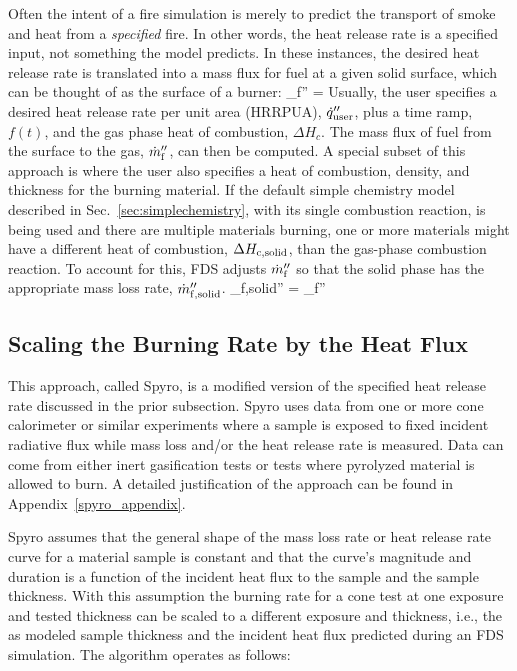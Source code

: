 Often the intent of a fire simulation is merely to predict the transport of smoke and heat from a {\em specified} fire. In other words, the heat release rate is a specified input, not something the model predicts. In these instances, the desired heat release rate is translated into a mass flux for fuel at a given solid surface, which can be thought of as the surface of a burner:
\be
   \dm_{\rm f}'' = 
\ee
Usually, the user specifies a desired heat release rate per unit area (HRRPUA), $\dot{q}_{\rm user}''$, plus a time ramp, $f(t)$, and the gas phase heat of combustion, $\Delta H_{\si{c}}$. The mass flux of fuel from the surface to the gas, $\dot{m}_{\rm f}''$, can then be computed. A special subset of this approach is where the user also specifies a heat of combustion, density, and thickness for the burning material. If the default simple chemistry model described in Sec.~\ref{sec:simplechemistry}, with its single combustion reaction, is being used and there are multiple materials burning, one or more materials might have a different heat of combustion, $\Delta H_{\si{c}{\rm ,solid}}$, than the gas-phase combustion reaction. To account for this, FDS adjusts $\dot{m}_{\rm f}''$ so that the solid phase has the appropriate mass loss rate, $\dot{m}_{\rm f,solid}''$.
\be
\dm_{\rm f,solid}'' = \dm_{\rm f}'' 
\ee

\subsection{Scaling the Burning Rate by the Heat Flux}
\label{spyro_algorithm}

This approach, called Spyro, is a modified version of the specified heat release rate discussed in the prior subsection. Spyro uses data from one or more cone calorimeter or similar experiments where a sample is exposed to fixed incident radiative flux while mass loss and/or the heat release rate is measured. Data can come from either inert gasification tests or tests where pyrolyzed material is allowed to burn. A detailed justification of the approach can be found in Appendix~\ref{spyro_appendix}.


Spyro assumes that the general shape of the mass loss rate or heat release rate curve for a material sample is constant and that the curve's magnitude and duration is a function of the incident heat flux to the sample and the sample thickness. With this assumption the burning rate for a cone test at one exposure and tested thickness can be scaled to a different exposure and thickness, i.e., the as modeled sample thickness and the incident heat flux predicted during an FDS simulation. The algorithm operates as follows:

